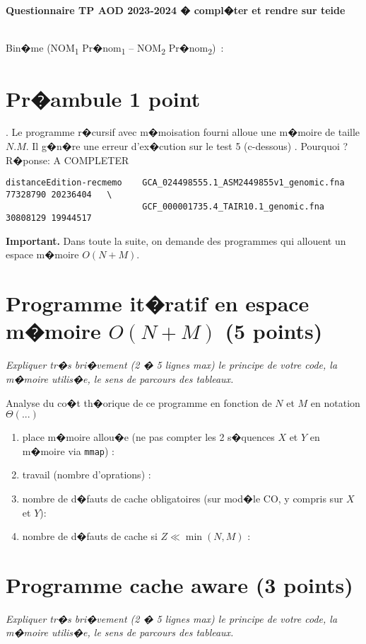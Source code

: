 \documentclass[10pt,a4paper]{article}
\begin{document}
\thispagestyle{empty}

\noindent\centerline{\bf\large Questionnaire  TP AOD 2023-2024 � compl�ter et rendre sur teide  } \\
Bin�me 
(NOM\textsubscript{1} Pr�nom\textsubscript{1} --
 NOM\textsubscript{2} Pr�nom\textsubscript{2})
\,: \dotfill

\section{Pr�ambule 1 point}.
Le programme r�cursif avec m�moisation fourni alloue une m�moire de taille $N.M$.
Il g�n�re une erreur d'ex�cution sur le test 5 (c-dessous) . Pourquoi ? \\
R�ponse:  A COMPLETER 
\begin{verbatim}
distanceEdition-recmemo    GCA_024498555.1_ASM2449855v1_genomic.fna 77328790 20236404   \
                           GCF_000001735.4_TAIR10.1_genomic.fna 30808129 19944517 
\end{verbatim}

{\noindent\bf{Important}.} Dans toute la suite, on demande des programmes qui allouent un espace m�moire $O(N+M)$.

\section{Programme it�ratif en espace m�moire $O(N+M)$ (5 points)}
{\em Expliquer tr�s bri�vement (2 � 5 lignes max) le principe de votre code, la m�moire utilis�e, le sens de parcours des tableaux.}
\vspace*{1.0cm}

Analyse du co�t th�orique de ce  programme en fonction de $N$ et $M$  en notation $\Theta(...)$ 
\begin{enumerate}
  \item place m�moire allou�e (ne pas compter les 2 s�quences $X$ et $Y$ en m�moire via {\tt mmap}) : 
  \item travail (nombre d'oprations) : 
  \item nombre de d�fauts de cache obligatoires (sur mod�le CO, y compris sur $X$ et $Y$):
  \item nombre de d�fauts de cache si $Z \ll \min(N,M)$ : 
\end{enumerate}

\section{Programme cache aware  (3 points)}
{\em Expliquer tr�s bri�vement (2 � 5 lignes max) le principe de votre code, la m�moire utilis�e, le sens de parcours des tableaux.}
\vspace*{1.0cm}
\end{document}
